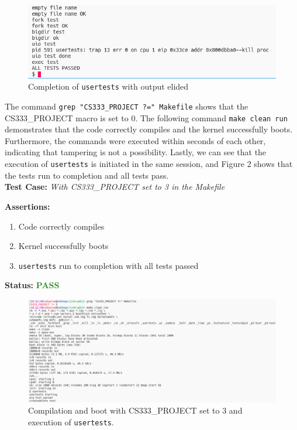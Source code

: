 \documentclass[11pt,letterpaper]{report}
\newcommand{\code}[1]{\colorbox{codegray}{\texttt{#1}}}
\begin{document}
{  \begin{figure}[h!]
	\centering
	\includegraphics[width=1\linewidth]{compilation1-usertests2.png}
	\caption[img]{Completion of \code{usertests} with output elided}
	\label{fig:P1compileP0-1}
  \end{figure}

  The command \code{grep "CS333\_PROJECT ?=" Makefile} shows that the CS333\_PROJECT macro is set to 0.
  The following command \code{make clean run} demonstrates that the code correctly compiles and the kernel successfully boots. 
  Furthermore, the commands were executed within seconds of each other, indicating that
  tampering is not a possibility. Lastly, we can see that the execution of \code{usertests}
  is initiated in the same session, and Figure 2 shows that the tests run to completion and 
  all tests pass. \\

  \noindent\textbf{Test Case:} \emph{With CS333\_PROJECT set to 3 in the Makefile}
  
  \noindent\textbf{Assertions:}
  \begin{enumerate}[]
  \item Code correctly compiles
  \item Kernel successfully boots
  \item \code{usertests} run to completion with all tests passed
  \end{enumerate}  
  
  \noindent\textbf{Status:} \textcolor{ForestGreen}{\textbf{PASS}}
  
  \begin{figure}[h!]
	\centering
	\includegraphics[width=1\linewidth]{compilation2-usertests1.png}
	\caption[img]{Compilation and boot with CS333\_PROJECT set to 3 and execution of \code{usertests}.}
	\label{fig:P1compileP0-1}
  \end{figure}

}
\end{document}
